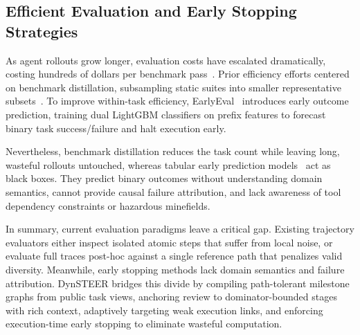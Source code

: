 \subsection{Efficient Evaluation and Early Stopping Strategies}
As agent rollouts grow longer, evaluation costs have escalated dramatically, costing hundreds of dollars per benchmark pass~\citep{shi2025earlyeval}. Prior efficiency efforts centered on benchmark distillation, subsampling static suites into smaller representative subsets~\citep{aslam2006statistical,shi2025earlyeval}. To improve within-task efficiency, EarlyEval~\citep{shi2025earlyeval} introduces early outcome prediction, training dual LightGBM classifiers on prefix features to forecast binary task success/failure and halt execution early. 

Nevertheless, benchmark distillation reduces the task count while leaving long, wasteful rollouts untouched, whereas tabular early prediction models~\citep{shi2025earlyeval} act as black boxes. They predict binary outcomes without understanding domain semantics, cannot provide causal failure attribution, and lack awareness of tool dependency constraints or hazardous minefields.

In summary, current evaluation paradigms leave a critical gap. Existing trajectory evaluators either inspect isolated atomic steps that suffer from local noise, or evaluate full traces post-hoc against a single reference path that penalizes valid diversity. Meanwhile, early stopping methods lack domain semantics and failure attribution. DynSTEER bridges this divide by compiling path-tolerant milestone graphs from public task views, anchoring review to dominator-bounded stages with rich context, adaptively targeting weak execution links, and enforcing execution-time early stopping to eliminate wasteful computation.
